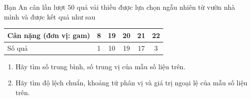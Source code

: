 \begin{bt}%
Bạn An cân lần lượt $50$ quả vải thiều được lựa chọn ngẫu nhiên từ vườn nhà mình và được kết quả như sau
\begin{center}
	\begin{tabular}{|l|c|c|c|c|c|}
		\hline
		Cân nặng (đơn vị: gam)&8&19&20&21&22\\
		\hline
		Số quả&1&10&19&17&3\\
		\hline
	\end{tabular}
\end{center}
\begin{enumerate}
	\item Hãy tìm số trung bình, số trung vị của mẫu số liệu trên.
	\item Hãy tìm độ lệch chuẩn, khoảng tứ phân vị và giá trị ngoại lệ của mẫu số liệu trên.
\end{enumerate}	
\end{bt}

